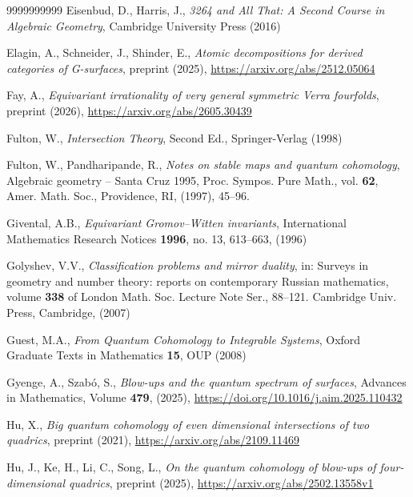 \documentclass[11pt]{amsart}
\theoremstyle{plain}
\numberwithin{equation}{section}
\theoremstyle{definition}
\theoremstyle{remark}
\begin{document}
\begin{thebibliography}{9999999999}
Eisenbud, D., Harris, J., \emph{3264 and All That: A Second Course in Algebraic Geometry}, Cambridge University Press (2016)

Elagin, A., Schneider, J., Shinder, E., \emph{Atomic decompositions for derived categories of G-surfaces}, preprint (2025),  \href{https://arxiv.org/abs/2512.05064}{https://arxiv.org/abs/2512.05064}

Fay, A., \emph{Equivariant irrationality of very general symmetric Verra fourfolds}, preprint (2026), \href{https://arxiv.org/abs/2605.30439}{https://arxiv.org/abs/2605.30439}

Fulton, W., \emph{Intersection Theory}, Second Ed., Springer-Verlag (1998)

Fulton, W., Pandharipande, R., \emph{Notes on stable maps and quantum cohomology}, Algebraic geometry -- Santa Cruz 1995, Proc. Sympos. Pure Math., vol. \textbf{62}, Amer. Math. Soc., Providence, RI, (1997), 45--96.

Givental, A.B.,
\emph{Equivariant Gromov--Witten invariants},
International Mathematics Research Notices \textbf{1996}, no. 13,
613--663, (1996)


Golyshev, V.V., \emph{Classification problems and mirror duality}, in: Surveys in geometry and number theory:
reports on contemporary Russian mathematics, volume \textbf{338} of London Math. Soc. Lecture Note Ser., 
88--121. Cambridge Univ. Press, Cambridge, (2007)

Guest, M.A., \emph{From Quantum Cohomology to Integrable Systems}, Oxford Graduate Texts in Mathematics \textbf{15}, OUP (2008)

Gyenge, A., Szab\'{o}, S.,
\emph{Blow-ups and the quantum spectrum of surfaces},
Advances in Mathematics,
Volume \textbf{479},
(2025),
\href{https://doi.org/10.1016/j.aim.2025.110432}{https://doi.org/10.1016/j.aim.2025.110432}

Hu, X., \emph{Big quantum cohomology of even dimensional intersections of two quadrics}, preprint (2021), \href{https://arxiv.org/abs/2109.11469}{https://arxiv.org/abs/2109.11469}


Hu, J., Ke, H., Li, C., Song, L.,
\emph{On the quantum cohomology of blow-ups of four-dimensional quadrics}, preprint (2025), \href{https://arxiv.org/abs/2502.13558v1}{https://arxiv.org/abs/2502.13558v1}


\end{thebibliography}
\end{document}
